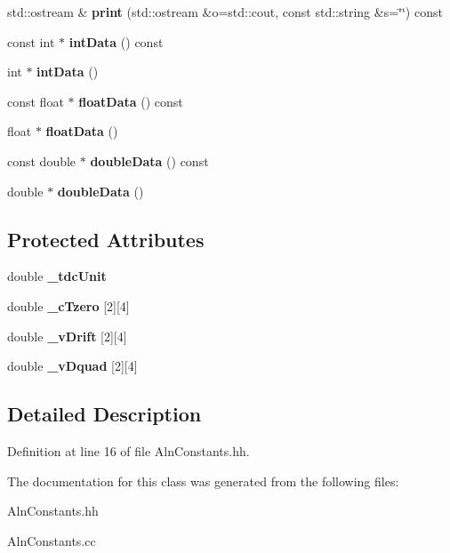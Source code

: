 \begin{DoxyCompactItemize}
\item 
std\-::ostream \& {\bfseries print} (std\-::ostream \&o=std\-::cout, const std\-::string \&s=\char`\"{}\char`\"{}) const \label{classTBTrack_1_1AlnConstants_aa01bb46450b492761c90392eb81411bc}

\item 
const int $\ast$ {\bfseries int\-Data} () const \label{classTBTrack_1_1AlnConstants_afb793481bc8c9ea4786e9e52144cb708}

\item 
int $\ast$ {\bfseries int\-Data} ()\label{classTBTrack_1_1AlnConstants_a5ffc45d080fe15974fca534ae01c3146}

\item 
const float $\ast$ {\bfseries float\-Data} () const \label{classTBTrack_1_1AlnConstants_a2d50c758aa6c1a6bbfa4790d7c1d1ed1}

\item 
float $\ast$ {\bfseries float\-Data} ()\label{classTBTrack_1_1AlnConstants_a48b746d9e7043bd80d2968bed18f21ef}

\item 
const double $\ast$ {\bfseries double\-Data} () const \label{classTBTrack_1_1AlnConstants_afd83d2588465d22b8ef17cb39326ee5b}

\item 
double $\ast$ {\bfseries double\-Data} ()\label{classTBTrack_1_1AlnConstants_aa07f0bb0b3cdde7eb56afa7050e626d9}

\end{DoxyCompactItemize}
\subsection*{Protected Attributes}
\begin{DoxyCompactItemize}
\item 
double {\bfseries \-\_\-tdc\-Unit}\label{classTBTrack_1_1AlnConstants_a2cf1c1f9615a86de4d37f9a72ff0292b}

\item 
double {\bfseries \-\_\-c\-Tzero} [2][4]\label{classTBTrack_1_1AlnConstants_af55cc6424803c2d11d027bcec1b64f82}

\item 
double {\bfseries \-\_\-v\-Drift} [2][4]\label{classTBTrack_1_1AlnConstants_a31dab51bbeacb52b53f8d1bc2cd2466a}

\item 
double {\bfseries \-\_\-v\-Dquad} [2][4]\label{classTBTrack_1_1AlnConstants_a91b9a4fcb791b1a3aeade9408633bbcf}

\end{DoxyCompactItemize}


\subsection{Detailed Description}


Definition at line 16 of file Aln\-Constants.\-hh.



The documentation for this class was generated from the following files\-:\begin{DoxyCompactItemize}
\item 
Aln\-Constants.\-hh\item 
Aln\-Constants.\-cc\end{DoxyCompactItemize}
